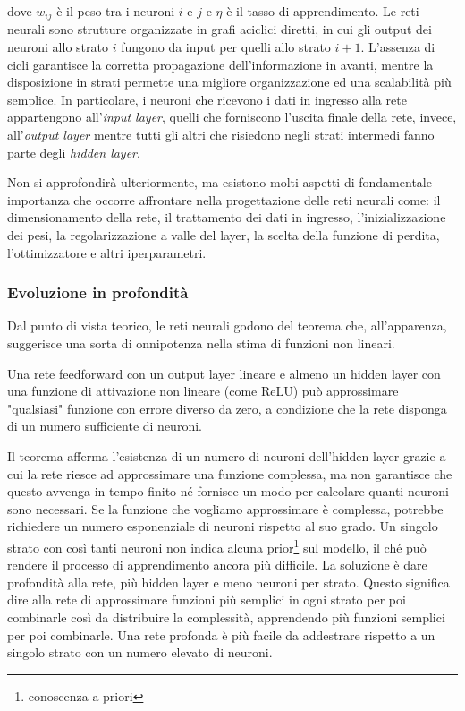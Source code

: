 dove \(w_{ij}\) è il peso tra i neuroni \(i\) e \(j\) e \(\eta\) è il tasso di apprendimento. Le reti neurali sono strutture organizzate in grafi aciclici diretti, in cui gli output dei neuroni allo strato $i$ fungono da input per quelli allo strato $i+1$. L'assenza di cicli garantisce la corretta propagazione dell’informazione in avanti, mentre la disposizione in strati permette una migliore organizzazione ed una scalabilità più semplice. In particolare, i neuroni che ricevono i dati in ingresso alla rete appartengono all'\textit{input layer}, quelli che forniscono l'uscita finale della rete, invece, all'\textit{output layer} mentre tutti gli altri che risiedono negli strati intermedi fanno parte degli \textit{hidden layer}. 

Non si approfondirà ulteriormente, ma esistono molti aspetti di fondamentale importanza che occorre affrontare nella progettazione delle reti neurali come: il dimensionamento della rete, il trattamento dei dati in ingresso, l'inizializzazione dei pesi, la regolarizzazione a valle del layer, la scelta della funzione di perdita, l'ottimizzatore e altri iperparametri.


\subsubsection{Evoluzione in profondità}
Dal punto di vista teorico, le reti neurali godono del teorema che, all'apparenza, suggerisce una sorta di onnipotenza nella stima di funzioni non lineari.

\begin{theorem}
    Una rete feedforward con un output layer lineare e almeno un hidden layer con una funzione di attivazione non lineare (come ReLU) può approssimare "qualsiasi" funzione con errore diverso da zero, a condizione che la rete disponga di un numero sufficiente di neuroni.
\end{theorem}

Il teorema afferma l'esistenza di un numero di neuroni dell'hidden layer grazie a cui la rete riesce ad approssimare una funzione complessa, ma non garantisce che questo avvenga in tempo finito né fornisce un modo per calcolare quanti neuroni sono necessari. Se la funzione che vogliamo approssimare è complessa, potrebbe richiedere un numero esponenziale di neuroni rispetto al suo grado. Un singolo strato con così tanti neuroni non indica alcuna prior\footnote{conoscenza a priori} sul modello, il ché può rendere il processo di apprendimento ancora più difficile. La soluzione è dare profondità alla rete, più hidden layer e meno neuroni per strato. Questo significa dire alla rete di approssimare funzioni più semplici in ogni strato per poi combinarle così da distribuire la complessità, apprendendo più funzioni semplici per poi combinarle. Una rete profonda è più facile da addestrare rispetto a un singolo strato con un numero elevato di neuroni.

